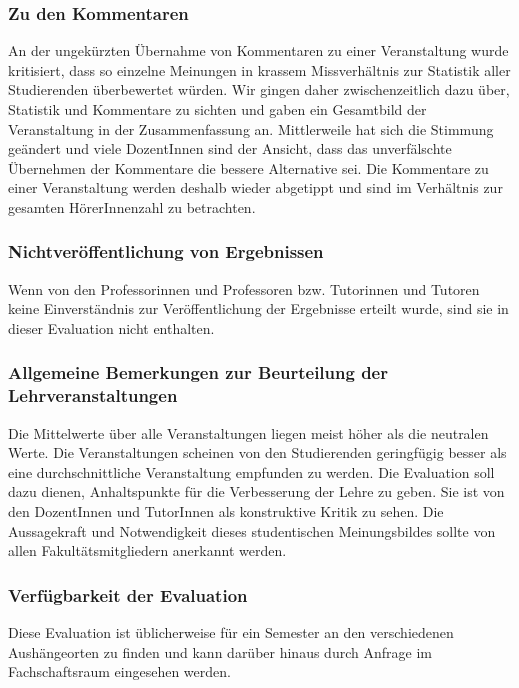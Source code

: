 \subsubsection{Zu den Kommentaren}

An der ungekürzten Übernahme von Kommentaren zu einer Veranstaltung wurde kritisiert, dass so einzelne Meinungen in krassem Missverhältnis zur Statistik aller Studierenden überbewertet würden. Wir gingen daher zwischenzeitlich dazu über, Statistik und Kommentare zu sichten und gaben ein Gesamtbild der Veranstaltung in der Zusammenfassung an. Mittlerweile hat sich die Stimmung geändert und viele DozentInnen sind der Ansicht, dass das unverfälschte Übernehmen der Kommentare die bessere Alternative sei. Die Kommentare zu einer Veranstaltung werden deshalb wieder abgetippt und sind im Verhältnis zur gesamten HörerInnenzahl zu betrachten.

\subsubsection{Nichtveröffentlichung von Ergebnissen}
Wenn von den Professorinnen und Professoren bzw. Tutorinnen und Tutoren keine Einverständnis zur Veröffentlichung der Ergebnisse erteilt wurde, sind sie in dieser Evaluation nicht enthalten. 

\subsubsection{Allgemeine Bemerkungen zur Beurteilung der Lehrveranstaltungen}

Die Mittelwerte über alle Veranstaltungen liegen meist höher als die neutralen Werte. Die Veranstaltungen scheinen von den Studierenden geringfügig besser als eine durchschnittliche Veranstaltung empfunden zu werden. Die Evaluation soll dazu dienen, Anhaltspunkte für die Verbesserung der Lehre zu geben. Sie ist von den DozentInnen und TutorInnen als konstruktive Kritik zu sehen. Die Aussagekraft und Notwendigkeit dieses studentischen Meinungsbildes sollte von allen Fakultätsmitgliedern anerkannt werden.

\subsubsection{Verfügbarkeit der Evaluation}

Diese Evaluation ist üblicherweise für ein Semester an den verschiedenen Aushängeorten zu finden und kann darüber hinaus durch Anfrage im Fachschaftsraum eingesehen werden.
